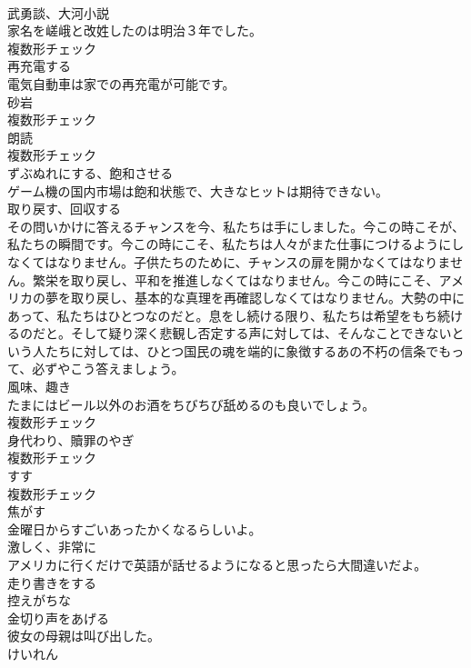 \documentclass[8pt]{extreport}
\begin{document}
\begin{CJK}{UTF8}{min}
\\	[名詞]	武勇談、大河小説	
\\	家名を嵯峨と改姓したのは明治３年でした。	
\\	複数形チェック
\\	[動詞]	再充電する	
\\	電気自動車は家での再充電が可能です。	
\\	[名詞]	砂岩	
\\	複数形チェック
\\	[名詞]	朗読	
\\	複数形チェック
\\	[動詞]	ずぶぬれにする、飽和させる	
\\	ゲーム機の国内市場は飽和状態で、大きなヒットは期待できない。	
\\	[動詞]	取り戻す、回収する	
\\	その問いかけに答えるチャンスを今、私たちは手にしました。今この時こそが、私たちの瞬間です。今この時にこそ、私たちは人々がまた仕事につけるようにしなくてはなりません。子供たちのために、チャンスの扉を開かなくてはなりません。繁栄を取り戻し、平和を推進しなくてはなりません。今この時にこそ、アメリカの夢を取り戻し、基本的な真理を再確認しなくてはなりません。大勢の中にあって、私たちはひとつなのだと。息をし続ける限り、私たちは希望をもち続けるのだと。そして疑り深く悲観し否定する声に対しては、そんなことできないという人たちに対しては、ひとつ国民の魂を端的に象徴するあの不朽の信条でもって、必ずやこう答えましょう。	
\\	[名詞]	風味、趣き	
\\	たまにはビール以外のお酒をちびちび舐めるのも良いでしょう。	
\\	複数形チェック
\\	[名詞]	身代わり、贖罪のやぎ	
\\	複数形チェック
\\	[名詞]	すす	
\\	複数形チェック
\\	[動詞]	焦がす	
\\	金曜日からすごいあったかくなるらしいよ。	
\\	[副詞]	激しく、非常に	
\\	アメリカに行くだけで英語が話せるようになると思ったら大間違いだよ。	
\\	[動詞]	走り書きをする	
\\	[形容詞]	控えがちな	
\\	[形容詞]	金切り声をあげる	
\\	彼女の母親は叫び出した。	
\\	[名詞]	けいれん	

\end{CJK}
\end{document}
